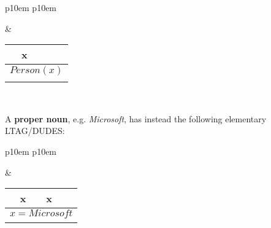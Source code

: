 \medskip
\begin{center}
\begin{tabular}{ p{10em} p{10em} }
	\label{tbl:grammar.people}
	
	\begin{center}
		\begin{tikzpicture}
		\Tree [.NP people ]
		\end{tikzpicture}
	\end{center}
		
	&
	
	\begin{center}
		\begin{tabular}{|c|l|}
			\hline
			x & \mbox{}\\ 
			\hline
			\multicolumn{2}{|l|}{
				$Person(x)$
			} \\
			\hline
			\multicolumn{2}{|l|}{
				\mbox{}
			} \\
			\hline
		\end{tabular}
	\end{center}	
	\\
\end{tabular}
\end{center}
\medskip

A \textbf{proper noun}, e.g. \textit{Microsoft}, has instead the following elementary LTAG/DUDES:
 
\medskip
\begin{center}
\begin{tabular}{ p{10em} p{10em} }
	\label{tbl:grammar.microsoft}
	
	\begin{center}
		\begin{tikzpicture}
		\Tree [.DP Microsoft ]
		\end{tikzpicture}
	\end{center}
		
	&
	
	\begin{center}
		\begin{tabular}{|c|l|}
			\hline
			x & x\\ 
			\hline
			\multicolumn{2}{|l|}{
				$x=Microsoft$
			} \\

			\hline
			\multicolumn{2}{|l|}{
				\mbox{}
			} \\
			\hline
		\end{tabular}
	\end{center}	
	\\
\end{tabular}
\end{center}
\medskip

